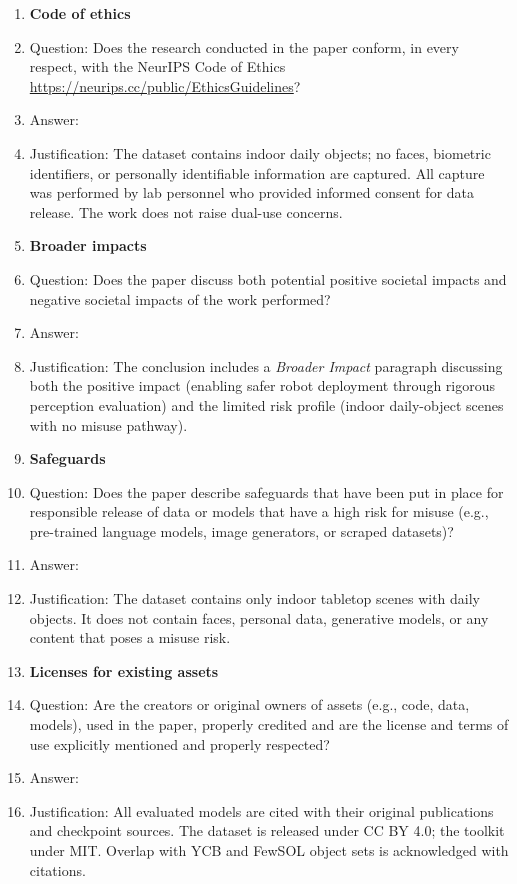 \begin{enumerate}
\item {\bf Code of ethics}
    \item[] Question: Does the research conducted in the paper conform, in every respect, with the NeurIPS Code of Ethics \url{https://neurips.cc/public/EthicsGuidelines}?
    \item[] Answer: \answerYes{}
    \item[] Justification: The dataset contains indoor daily objects; no faces, biometric identifiers, or personally identifiable information are captured. All capture was performed by lab personnel who provided informed consent for data release. The work does not raise dual-use concerns.

\item {\bf Broader impacts}
    \item[] Question: Does the paper discuss both potential positive societal impacts and negative societal impacts of the work performed?
    \item[] Answer: \answerYes{}
    \item[] Justification: The conclusion includes a \emph{Broader Impact} paragraph discussing both the positive impact (enabling safer robot deployment through rigorous perception evaluation) and the limited risk profile (indoor daily-object scenes with no misuse pathway).

\item {\bf Safeguards}
    \item[] Question: Does the paper describe safeguards that have been put in place for responsible release of data or models that have a high risk for misuse (e.g., pre-trained language models, image generators, or scraped datasets)?
    \item[] Answer: \answerNA{}
    \item[] Justification: The dataset contains only indoor tabletop scenes with daily objects. It does not contain faces, personal data, generative models, or any content that poses a misuse risk.

\item {\bf Licenses for existing assets}
    \item[] Question: Are the creators or original owners of assets (e.g., code, data, models), used in the paper, properly credited and are the license and terms of use explicitly mentioned and properly respected?
    \item[] Answer: \answerYes{}
    \item[] Justification: All evaluated models are cited with their original publications and checkpoint sources. The dataset is released under CC BY 4.0; the toolkit under MIT. Overlap with YCB and FewSOL object sets is acknowledged with citations.


\end{enumerate}
